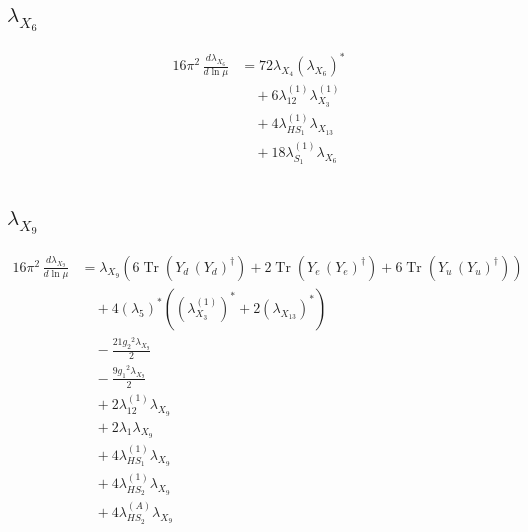 \documentclass[10pt,a4paper]{article}
\begin{document}
\subsection*{$\lambda_{X_{6}}$}
\begin{align*}
16\pi^2\,\frac{d \lambda_{X_{6}}}{d\ln\mu} &=72 {\lambda_{X_{4}}} \left({\lambda_{X_{6}}}\right)^{*} \\
&\quad +6 {\lambda_{12}^{(1)}} {\lambda_{X_{3}}^{(1)}} \\
&\quad +4 {\lambda_{HS_1}^{(1)}} {\lambda_{X_{13}}} \\
&\quad +18 {\lambda_{S_1}^{(1)}} {\lambda_{X_{6}}} \\
\end{align*}
\subsection*{$\lambda_{X_{9}}$}
\begin{align*}
16\pi^2\,\frac{d \lambda_{X_{9}}}{d\ln\mu} &={\lambda_{X_{9}}} (6 \operatorname{Tr}\!\left({Y_d}\,\left({Y_d}\right)^{\dagger}\right)+2 \operatorname{Tr}\!\left({Y_e}\,\left({Y_e}\right)^{\dagger}\right)+6 \operatorname{Tr}\!\left({Y_u}\,\left({Y_u}\right)^{\dagger}\right)) \\
&\quad +4 \left({\lambda_5}\right)^{*} (\left({\lambda_{X_{3}}^{(1)}}\right)^{*}+2 \left({\lambda_{X_{13}}}\right)^{*}) \\
&\quad -\frac{21 {g_2}^2 {\lambda_{X_{9}}}}{2} \\
&\quad -\frac{9 {g_1}^2 {\lambda_{X_{9}}}}{2} \\
&\quad +2 {\lambda_{12}^{(1)}} {\lambda_{X_{9}}} \\
&\quad +2 {\lambda_1} {\lambda_{X_{9}}} \\
&\quad +4 {\lambda_{HS_1}^{(1)}} {\lambda_{X_{9}}} \\
&\quad +4 {\lambda_{HS_2}^{(1)}} {\lambda_{X_{9}}} \\
&\quad +4 {\lambda_{HS_2}^{(A)}} {\lambda_{X_{9}}} \\
\end{align*}
\end{document}
